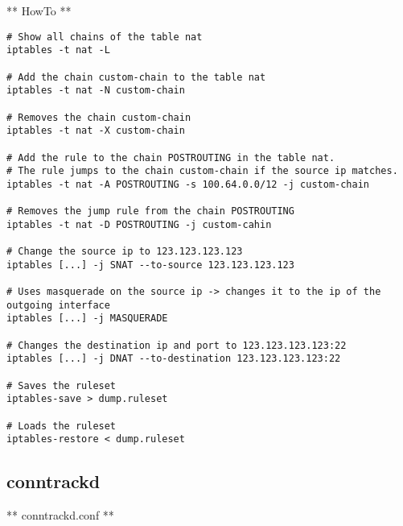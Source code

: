 ** HowTo **

\begin{verbatim}
# Show all chains of the table nat
iptables -t nat -L

# Add the chain custom-chain to the table nat
iptables -t nat -N custom-chain

# Removes the chain custom-chain
iptables -t nat -X custom-chain

# Add the rule to the chain POSTROUTING in the table nat.
# The rule jumps to the chain custom-chain if the source ip matches.
iptables -t nat -A POSTROUTING -s 100.64.0.0/12 -j custom-chain

# Removes the jump rule from the chain POSTROUTING
iptables -t nat -D POSTROUTING -j custom-cahin

# Change the source ip to 123.123.123.123
iptables [...] -j SNAT --to-source 123.123.123.123

# Uses masquerade on the source ip -> changes it to the ip of the outgoing interface
iptables [...] -j MASQUERADE

# Changes the destination ip and port to 123.123.123.123:22
iptables [...] -j DNAT --to-destination 123.123.123.123:22

# Saves the ruleset
iptables-save > dump.ruleset

# Loads the ruleset
iptables-restore < dump.ruleset
\end{verbatim}

\subsection{conntrackd}\label{conntrackd}

** conntrackd.conf **

